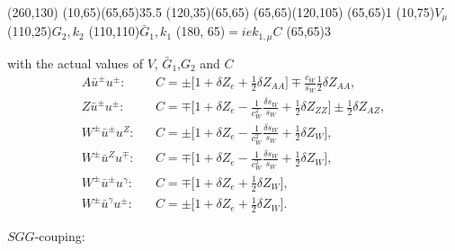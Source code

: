 \begin{axopicture}(260,130) %
	\Photon(10,65)(65,65){3}{5.5}
	(120,35)(65,65)
	(65,65)(120,105)
	\Vertex(65,65){1}		
	\Text(10,75){$V_\mu$}
	\Text(110,25){$G_2,k_2$}
	\Text(110,110){$\bar{G}_1,k_1$}
	\Text(180, 65){$=iek_{1,\mu}C$}
	\Vertex(65,65){3}
\end{axopicture}
\newline with the actual values of $V$, $\bar{G}_1$,$G_2$ and $C$
\begin{eqnarray}
A\bar{u}^\pm u^\pm:&& C=\pm\biggl[1+\delta Z_e+\frac{1}{2}\delta Z_{AA}\biggr]\mp\frac{c_W}{s_W}\frac{1}{2}\delta Z_{AA},\nonumber\\
Z\bar{u}^\pm u^\pm:&& C=\mp\biggl[1+\delta Z_e-\frac{1}{c_W^2}\frac{\delta s_W}{s_W}+\frac{1}{2}\delta Z_{ZZ}\biggr]\pm\frac{1}{2}\delta Z_{AZ},\nonumber\\
W^\pm\bar{u}^\pm u^Z:&& C=\pm\biggl[1+\delta Z_e-\frac{1}{c_W^2}\frac{\delta s_W}{s_W}+\frac{1}{2}\delta Z_{W}\biggr],\nonumber\\
W^\pm\bar{u}^Z u^\mp:&& C=\mp\biggl[1+\delta Z_e-\frac{1}{c_W^2}\frac{\delta s_W}{s_W}+\frac{1}{2}\delta Z_{W}\biggr],\nonumber\\
W^\pm\bar{u}^\pm u^\gamma:&& C=\mp\biggl[1+\delta Z_e+\frac{1}{2}\delta Z_{W}\biggr],\nonumber\\
W^\pm\bar{u}^\gamma u^\pm:&& C=\pm\biggl[1+\delta Z_e+\frac{1}{2}\delta Z_{W}\biggr].
\end{eqnarray}

$SGG$-couping:


